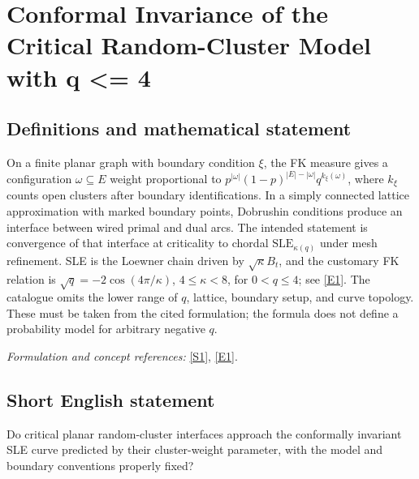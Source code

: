 \documentclass[11pt,a4paper]{article}
\newcommand{\sref}[2]{\hyperlink{source:#1:#2}{[S#2]}}
\newcommand{\eref}[2]{\hyperlink{extra:#1:#2}{[E#2]}}
\newif\ifshowcatalogue
\newcommand{\cataloguescope}[1]{\ifshowcatalogue
 \paragraph{Exact scope in the supplied catalogue.}
 \begin{quote}\small #1\end{quote}\fi}
\numberwithin{equation}{section}
\begin{document}
\setcounter{section}{172}
\clearpage
\section{\texorpdfstring{Conformal Invariance of the Critical Random-Cluster Model with q <= 4}{Conformal Invariance of the Critical Random-Cluster Model with q <= 4}}\label{173}
\subsection{Definitions and mathematical statement}
On a finite planar graph with boundary condition $\xi$, the FK measure gives a configuration $\omega\subseteq E$ weight proportional to
$p^{|\omega|}(1-p)^{|E|-|\omega|}q^{k_\xi(\omega)}$, where $k_\xi$ counts open clusters after boundary identifications. In a simply connected lattice approximation with marked boundary points, Dobrushin conditions produce an interface between wired primal and dual arcs. The intended statement is convergence of that interface at criticality to chordal $\mathrm{SLE}_{\kappa(q)}$ under mesh refinement. SLE is the Loewner chain driven by $\sqrt\kappa B_t$, and the customary FK relation is $\sqrt q=-2\cos(4\pi/\kappa)$, $4\le\kappa<8$, for $0<q\le4$; see \eref{173}{1}. The catalogue omits the lower range of $q$, lattice, boundary setup, and curve topology. These must be taken from the cited formulation; the formula does not define a probability model for arbitrary negative $q$.
\par\smallskip\textit{Formulation and concept references:} \sref{173}{1}, \eref{173}{1}.
\cataloguescope{Prove that the exploration path of the critical random-cluster (FK) model with q <= 4 converges in distribution to a Schramm-Loewner evolution SLE\_\{kappa(q)\} as the mesh size goes to zero, i.e., the scaling limit is conformally invariant.}
\subsection{Short English statement}
Do critical planar random-cluster interfaces approach the conformally invariant SLE curve predicted by their cluster-weight parameter, with the model and boundary conventions properly fixed?
\end{document}
